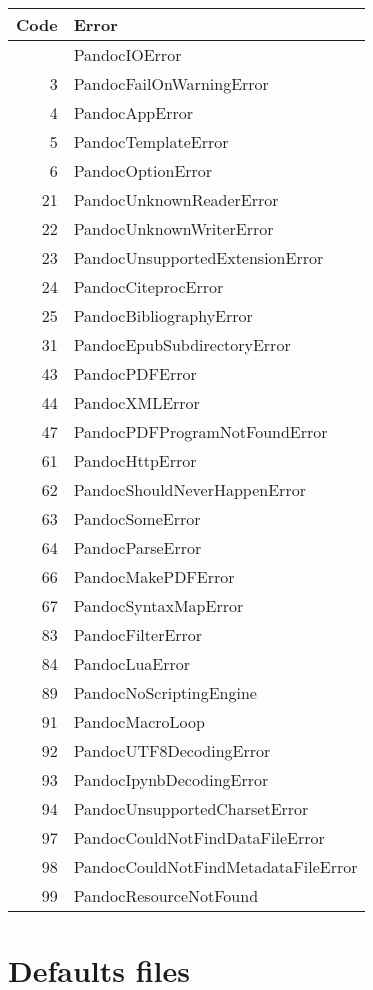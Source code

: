 \documentclass[
  a4paper,
]{article}
\begin{document}
\begin{longtable}[]{@{}rl@{}}
\toprule\noalign{}
Code & Error \\
\midrule\noalign{}
\endhead
\bottomrule\noalign{}
\endlastfoot
1 & PandocIOError \\
3 & PandocFailOnWarningError \\
4 & PandocAppError \\
5 & PandocTemplateError \\
6 & PandocOptionError \\
21 & PandocUnknownReaderError \\
22 & PandocUnknownWriterError \\
23 & PandocUnsupportedExtensionError \\
24 & PandocCiteprocError \\
25 & PandocBibliographyError \\
31 & PandocEpubSubdirectoryError \\
43 & PandocPDFError \\
44 & PandocXMLError \\
47 & PandocPDFProgramNotFoundError \\
61 & PandocHttpError \\
62 & PandocShouldNeverHappenError \\
63 & PandocSomeError \\
64 & PandocParseError \\
66 & PandocMakePDFError \\
67 & PandocSyntaxMapError \\
83 & PandocFilterError \\
84 & PandocLuaError \\
89 & PandocNoScriptingEngine \\
91 & PandocMacroLoop \\
92 & PandocUTF8DecodingError \\
93 & PandocIpynbDecodingError \\
94 & PandocUnsupportedCharsetError \\
97 & PandocCouldNotFindDataFileError \\
98 & PandocCouldNotFindMetadataFileError \\
99 & PandocResourceNotFound \\
\end{longtable}

\hypertarget{defaults-files}{%
\section{Defaults files}\label{defaults-files}}
\end{document}
